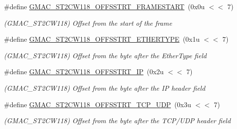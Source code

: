 \begin{DoxyCompactItemize}
\item 
\mbox{\label{group__SAME70__GMAC_ga1e583f64c31efe0a96d6126da510bd39}} 
\#define \mbox{\hyperlink{group__SAME70__GMAC_ga1e583f64c31efe0a96d6126da510bd39}{G\+M\+A\+C\+\_\+\+S\+T2\+C\+W118\+\_\+\+O\+F\+F\+S\+S\+T\+R\+T\+\_\+\+F\+R\+A\+M\+E\+S\+T\+A\+RT}}~(0x0u $<$$<$ 7)
\begin{DoxyCompactList}\small\item\em (G\+M\+A\+C\+\_\+\+S\+T2\+C\+W118) Offset from the start of the frame \end{DoxyCompactList}\item 
\mbox{\label{group__SAME70__GMAC_ga2fc365137ba5179b0bcece0d05b74384}} 
\#define \mbox{\hyperlink{group__SAME70__GMAC_ga2fc365137ba5179b0bcece0d05b74384}{G\+M\+A\+C\+\_\+\+S\+T2\+C\+W118\+\_\+\+O\+F\+F\+S\+S\+T\+R\+T\+\_\+\+E\+T\+H\+E\+R\+T\+Y\+PE}}~(0x1u $<$$<$ 7)
\begin{DoxyCompactList}\small\item\em (G\+M\+A\+C\+\_\+\+S\+T2\+C\+W118) Offset from the byte after the Ether\+Type field \end{DoxyCompactList}\item 
\mbox{\label{group__SAME70__GMAC_ga97f5729d8dd79af7488af2e068e5366d}} 
\#define \mbox{\hyperlink{group__SAME70__GMAC_ga97f5729d8dd79af7488af2e068e5366d}{G\+M\+A\+C\+\_\+\+S\+T2\+C\+W118\+\_\+\+O\+F\+F\+S\+S\+T\+R\+T\+\_\+\+IP}}~(0x2u $<$$<$ 7)
\begin{DoxyCompactList}\small\item\em (G\+M\+A\+C\+\_\+\+S\+T2\+C\+W118) Offset from the byte after the IP header field \end{DoxyCompactList}\item 
\mbox{\label{group__SAME70__GMAC_gada9cf902a1e0656a056e8ddd1f6af314}} 
\#define \mbox{\hyperlink{group__SAME70__GMAC_gada9cf902a1e0656a056e8ddd1f6af314}{G\+M\+A\+C\+\_\+\+S\+T2\+C\+W118\+\_\+\+O\+F\+F\+S\+S\+T\+R\+T\+\_\+\+T\+C\+P\+\_\+\+U\+DP}}~(0x3u $<$$<$ 7)
\begin{DoxyCompactList}\small\item\em (G\+M\+A\+C\+\_\+\+S\+T2\+C\+W118) Offset from the byte after the T\+C\+P/\+U\+DP header field \end{DoxyCompactList}\item 
\mbox{\label{group__SAME70__GMAC_ga80069e13fd930907c825e6ad16cc4712}} 

\end{DoxyCompactItemize}
